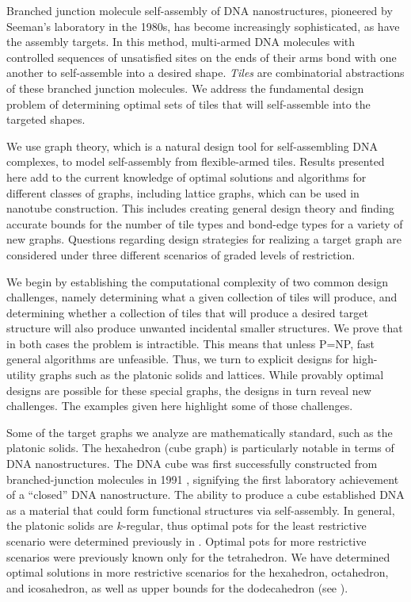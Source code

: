 \documentclass{elsarticle}
\theoremstyle{definition}
\theoremstyle{remark}
\theoremstyle{plain}
\theoremstyle{plain}
\begin{document}
Branched junction molecule self-assembly of DNA nanostructures, pioneered by Seeman's laboratory in the 1980s, has become increasingly sophisticated, as have the assembly targets. 
In this method, multi-armed DNA molecules with controlled sequences of unsatisfied sites on the ends of their arms bond with one another to self-assemble into a desired shape.  \emph{Tiles} are combinatorial abstractions of these branched junction molecules. We address the fundamental design problem of determining  optimal sets of tiles that will self-assemble into the targeted shapes.

We use graph theory, which is a  natural design tool for self-assembling DNA complexes, to model  self-assembly from flexible-armed tiles. Results presented here add to the current knowledge of optimal solutions and algorithms for different classes of graphs, including lattice graphs, which can be used in nanotube construction. This includes creating general design theory and finding accurate bounds for the number of tile types and bond-edge types for a variety of new graphs. Questions regarding design strategies for realizing a target graph are considered under three different scenarios of graded levels of restriction. 

We begin by establishing the computational complexity of two common design challenges, namely determining what a given collection of tiles will produce, and determining whether a collection of tiles that will produce a desired target structure will also produce unwanted incidental smaller structures.  We prove that in both cases the problem is intractible. This means that unless P=NP, fast general algorithms are unfeasible.  Thus, we turn to explicit designs for high-utility graphs such as the platonic solids and lattices.  While provably optimal designs are possible for these special graphs, the designs in turn reveal new challenges.  The examples given here highlight some of those challenges.  

Some of the target graphs we analyze are mathematically standard, such as the platonic solids. The hexahedron (cube graph) is particularly notable in terms of DNA nanostructures. The DNA cube was first successfully constructed from branched-junction molecules in 1991 \cite{chen1991synthesis}, signifying the first laboratory achievement of a ``closed'' DNA nanostructure. The ability to produce a cube established DNA as a material that could form functional structures via self-assembly. In general, the platonic solids are $k$-regular, thus optimal pots for the least restrictive scenario were determined previously in \cite{ellis2014minimal}. Optimal pots for more restrictive scenarios were previously known only for the tetrahedron. We have determined optimal solutions in more restrictive scenarios for the hexahedron, octahedron, and icosahedron, as well as upper bounds for the dodecahedron (see \cite{repository}).
\end{document}
